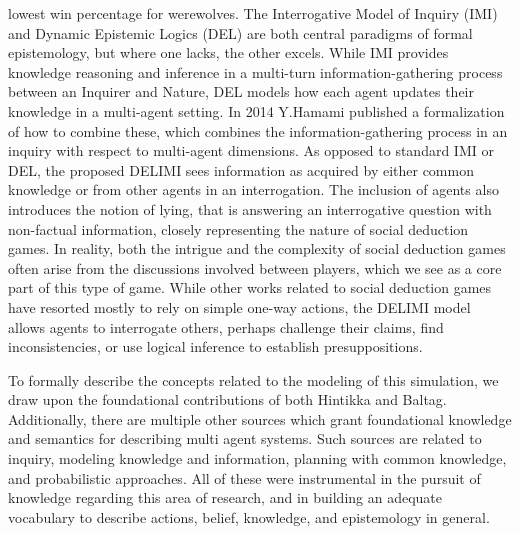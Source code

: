 lowest win percentage for werewolves. The Interrogative Model of Inquiry (IMI) 
and Dynamic Epistemic Logics (DEL) are both central paradigms of formal 
epistemology, but where one lacks, the other excels. While IMI provides 
knowledge reasoning and inference in a multi-turn information-gathering process 
between an Inquirer and Nature, DEL models how each agent updates their 
knowledge in a multi-agent setting. In 2014 Y.Hamami\cite{delimi} published a 
formalization of how to combine these, which combines the information-gathering 
process in an inquiry with respect to multi-agent dimensions. As opposed to 
standard IMI or DEL, the proposed DELIMI sees information as acquired by either 
common knowledge or from other agents in an interrogation. The inclusion of 
agents also introduces the notion of lying, that is answering an interrogative 
question with non-factual information, closely representing the nature of 
social deduction games. In reality, both the intrigue and the complexity of 
social deduction games often arise from the discussions involved between 
players, which we see as a core part of this type of game. While other works 
related to social deduction games have resorted mostly to rely on simple 
one-way actions, the DELIMI model allows agents to interrogate others, perhaps 
challenge their claims, find inconsistencies, or use logical inference to 
establish presuppositions.

To formally describe the concepts related to the modeling of this simulation, 
we draw upon the foundational contributions of both Hintikka\cite{hintikka} and 
Baltag\cite{Baltag}. Additionally, there are multiple other sources which grant 
foundational knowledge and semantics for describing multi agent systems. Such 
sources are related to inquiry\cite{delimi}, modeling knowledge and 
information\cite{modelling_multi_agent_epistemic_systems}, planning with common 
knowledge\cite{multi_agent_epistemic_planner_common_knowledge}, and 
probabilistic approaches\cite{probibalistic_multiagent_systems}. 
All of these were instrumental in the pursuit of knowledge regarding this area 
of research, and in building an adequate vocabulary to describe actions, 
belief, knowledge, and epistemology in general. 